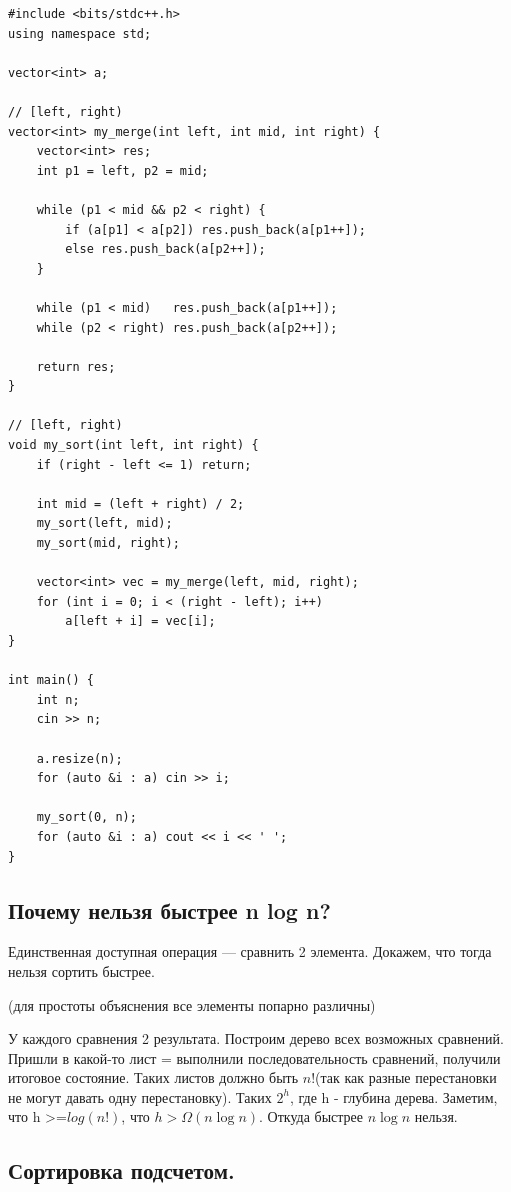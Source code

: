 \documentclass{article}
\begin{document}
\begin{lstlisting}[mathescape]
#include <bits/stdc++.h>
using namespace std;

vector<int> a;

// [left, right)
vector<int> my_merge(int left, int mid, int right) {
    vector<int> res;
    int p1 = left, p2 = mid;
    
    while (p1 < mid && p2 < right) {
        if (a[p1] < a[p2]) res.push_back(a[p1++]);
        else res.push_back(a[p2++]);
    }
    
    while (p1 < mid)   res.push_back(a[p1++]);
    while (p2 < right) res.push_back(a[p2++]);
    
    return res;
}

// [left, right)
void my_sort(int left, int right) {
    if (right - left <= 1) return;
    
    int mid = (left + right) / 2;
    my_sort(left, mid);
    my_sort(mid, right);
    
    vector<int> vec = my_merge(left, mid, right);
    for (int i = 0; i < (right - left); i++)
        a[left + i] = vec[i];
}

int main() {
    int n;
    cin >> n;
    
    a.resize(n);
    for (auto &i : a) cin >> i;
    
    my_sort(0, n);
    for (auto &i : a) cout << i << ' ';
}

\end{lstlisting}

\subsection *{Почему нельзя быстрее n log n?}

Единственная доступная операция --- сравнить 2 элемента. Докажем, что тогда нельзя сортить быстрее.

(для простоты объяснения все элементы попарно различны)

У каждого сравнения 2 результата.  Построим дерево всех возможных сравнений. Пришли в какой-то лист = выполнили последовательность сравнений, получили итоговое состояние. Таких листов должно быть $n!$(так как разные перестановки не могут давать одну перестановку). Таких $2^h$, где h - глубина дерева. Заметим, что  h >=$log(n!)$, что $h>\Omega(n\log n)$. Откуда быстрее $n\log n $ нельзя.

\subsection *{Сортировка подсчетом.}
\end{document}
